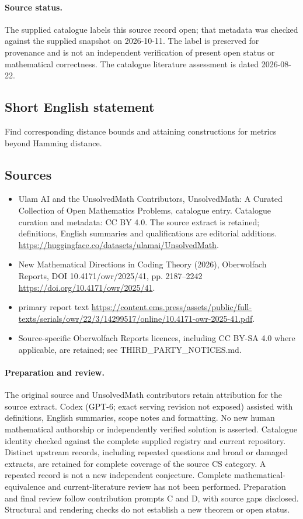 \documentclass[11pt]{article}
\begin{document}
\paragraph{Source status.}
The supplied catalogue labels this source record open; that metadata was checked against the supplied snapshot on 2026-10-11. The label is preserved for provenance and is not an independent verification of present open status or mathematical correctness. The catalogue literature assessment is dated 2026-08-22.
\subsection{Short English statement}
Find corresponding distance bounds and attaining constructions for metrics beyond Hamming distance.
\subsection{Sources}
\begin{itemize}
\item[S1] Ulam AI and the UnsolvedMath Contributors, UnsolvedMath: A Curated Collection of Open Mathematics Problems, catalogue entry. Catalogue curation and metadata: CC BY 4.0. The source extract is retained; definitions, English summaries and qualifications are editorial additions.
\url{https://huggingface.co/datasets/ulamai/UnsolvedMath}.
\item[S2] New Mathematical Directions in Coding Theory (2026), Oberwolfach Reports, DOI 10.4171/owr/2025/41, pp. 2187--2242
\url{https://doi.org/10.4171/owr/2025/41}.
\item[S3] primary report text
\url{https://content.ems.press/assets/public/full-texts/serials/owr/22/3/14299517/online/10.4171-owr-2025-41.pdf}.
\item Source-specific Oberwolfach Reports licences, including CC BY-SA 4.0 where applicable, are retained; see THIRD\_PARTY\_NOTICES.md.
\end{itemize}
\paragraph{Preparation and review.}
The original source and UnsolvedMath contributors retain attribution for the source extract. Codex (GPT-6; exact serving revision not exposed) assisted with definitions, English summaries, scope notes and formatting. No new human mathematical authorship or independently verified solution is asserted. Catalogue identity checked against the complete supplied registry and current repository. Distinct upstream records, including repeated questions and broad or damaged extracts, are retained for complete coverage of the source CS category. A repeated record is not a new independent conjecture. Complete mathematical-equivalence and current-literature review has not been performed. Preparation and final review follow contribution prompts C and D, with source gaps disclosed. Structural and rendering checks do not establish a new theorem or open status.
\label{end:statement}
\end{document}
